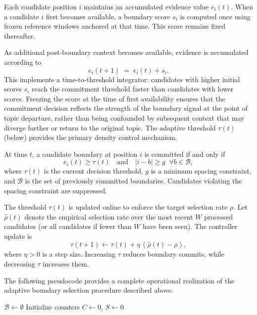 Each candidate position $i$ maintains an accumulated evidence value $e_i(t)$.
When a candidate $i$ first becomes available, a boundary score $s_i$ is computed
once using frozen reference windows anchored at that time. This score remains
fixed thereafter.

As additional post-boundary context becomes available, evidence is accumulated
according to
\[
e_i(t{+}1) \;=\; e_i(t) + s_i .
\]
This implements a time-to-threshold integrator: candidates with higher initial
scores $s_i$ reach the commitment threshold faster than candidates with lower
scores. Freezing the score at the time of first availability ensures that the
commitment decision reflects the strength of the boundary signal at the point of
topic departure, rather than being confounded by subsequent context that may
diverge further or return to the original topic. The adaptive threshold
$\tau(t)$ (below) provides the primary density control mechanism.

At time $t$, a candidate boundary at position $i$ is committed if and only if
\[
e_i(t) \ge \tau(t)
\quad\text{and}\quad
|i - b| \ge g \;\;\forall b \in \mathcal{B},
\]
where $\tau(t)$ is the current decision threshold, $g$ is a minimum spacing
constraint, and $\mathcal{B}$ is the set of previously committed boundaries.
Candidates violating the spacing constraint are suppressed.

The threshold $\tau(t)$ is updated online to enforce the target selection rate
$\rho$. Let $\hat{\rho}(t)$ denote the empirical selection rate over the most
recent $W$ processed candidates (or all candidates if fewer than $W$ have been
seen). The controller update is
\[
\tau(t{+}1) \leftarrow \tau(t) + \eta\,(\hat{\rho}(t) - \rho),
\]
where $\eta > 0$ is a step size. Increasing $\tau$ reduces boundary commits, while
decreasing $\tau$ increases them.

The following pseudocode provides a complete operational realization of the
adaptive boundary selection procedure described above.

\begin{algorithm}[t]
\caption{Adaptive boundary selection}
\label{alg:adaptive}


$\mathcal{B} \leftarrow \emptyset$\;
Initialize counters $C \leftarrow 0$, $S \leftarrow 0$\;

\end{algorithm}

